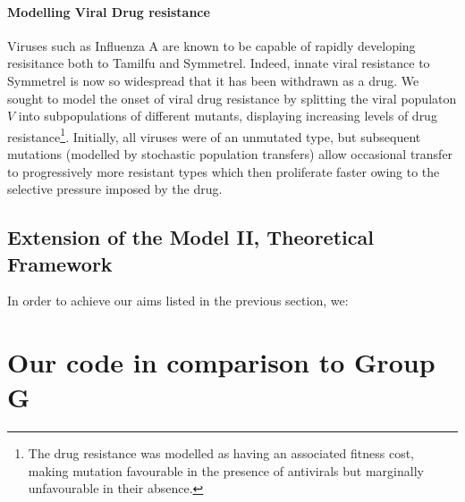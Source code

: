\documentclass[a4paper, 12pt]{report}
\begin{document}
\subsubsection{Modelling Viral Drug resistance}

Viruses such as Influenza A are known to be capable of rapidly developing resisitance both to Tamilfu and Symmetrel.
Indeed, innate viral resistance to Symmetrel is now so widespread that it has been withdrawn as a drug.
We sought to model the onset of viral drug resistance by splitting the viral populaton $V$ into subpopulations of different mutants, displaying increasing levels of drug resistance\footnote{The drug resistance was modelled as having an associated fitness cost, making mutation favourable in the presence of antivirals but marginally unfavourable in their absence.}. Initially, all viruses were of an unmutated type, but subsequent mutations (modelled by stochastic population transfers) allow occasional transfer to progressively more resistant types which then proliferate faster owing to the selective pressure imposed by the drug.





\section{Extension of the Model II, Theoretical Framework}

In order to achieve our aims listed in the previous section, we:



\chapter{Our code in comparison to Group G}

\newpage


\end{document}
